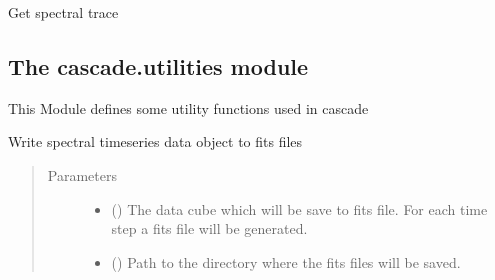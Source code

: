 \documentclass[a4paper,10pt,english]{sphinxmanual}
\begin{document}
\begin{fulllineitems}

\begin{fulllineitems}
\label{\detokenize{cascade.instruments:cascade.instruments.instruments.SpitzerIRS.get_spectral_trace}}
Get spectral trace

\end{fulllineitems}


\end{fulllineitems}



\subsection{The cascade.utilities module}
\label{\detokenize{cascade.utilities:module-cascade.utilities.utilities}}\label{\detokenize{cascade.utilities:the-cascade-utilities-module}}\label{\detokenize{cascade.utilities::doc}}
This Module defines some utility functions used in cascade

\begin{fulllineitems}
\label{\detokenize{cascade.utilities:cascade.utilities.utilities.write_timeseries_to_fits}}
Write spectral timeseries data object to fits files
\begin{quote}\begin{description}
\item[{Parameters}] \leavevmode\begin{itemize}
\item {} 
 () \textendash{} The data cube which will be save to fits file. For each time step
a fits file will be generated.

\item {} 
 () \textendash{} Path to the directory where the fits files will be saved.

\end{itemize}

\end{description}\end{quote}

\end{fulllineitems}
\end{document}
